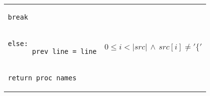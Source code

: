 \documentclass[10pt, a4paper]{article}
\begin{document}
\begin{tabular}{@{}ll}
{
\begin{lstlisting}[firstnumber=last, backgroundcolor=\color{darkorange}]
          break
\end{lstlisting}}
&\\
{
\begin{lstlisting}[firstnumber=last, backgroundcolor=\color{lightbrown}]
    else:
      prev_line = line
\end{lstlisting}}
&$0 \le i < |src| \,\wedge\, src[i] \ne \mathtt{'\{'}$\\
{
\begin{lstlisting}[firstnumber=last]
  return proc_names
\end{lstlisting}}
&\\
\end{tabular}\\



%
%
\end{document}
